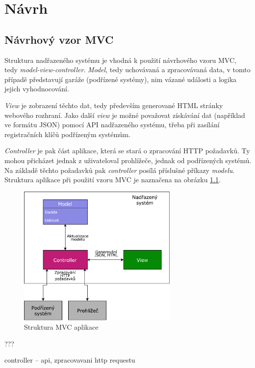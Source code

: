 \chapter{Návrh}
\label{sec:de}

\section{Návrhový vzor MVC}

Struktura nadřazeného systému je vhodná k použití návrhového vzoru MVC, tedy \textit{model-view-controller}. \textit{Model}, tedy  uchovávaná a zpracovávaná data, v tomto případě představují garáže (podřízené systémy), nim vázané události a logika jejich vyhodnocování. 

\textit{View} je zobrazení těchto dat, tedy především generované HTML stránky webového rozhraní. Jako další \textit{view} je možné považovat získávání dat (například ve formátu JSON) pomocí API nadřazeného systému, třeba při zasílání registračních klíčů podřízeným systémům.

\textit{Controller} je pak část aplikace, která se stará o zpracování HTTP požadavků. Ty mohou přicházet jednak z uživateloval prohlížeče, jednak od podřízených systémů. Na základě těchto požadavků pak \textit{controller} posílá příslušné příkazy \textit{modelu}. Struktura aplikace při použití vzoru MVC je naznačena na obrázku \ref{fig:mvc}.

\begin{figure}[h!]
    \centering
    \includegraphics[width=0.7\textwidth]{images/mvc.pdf}
    \caption{Struktura MVC aplikace}
    \label{fig:mvc}
\end{figure}

???

controller -- api, zpracovavani http requestu

